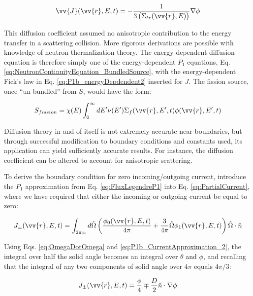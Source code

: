 \documentclass[10pt]{article}
\newcommand{\hO}{\hat{\Omega}}
\newcommand{\spas}{(\vv{r},E,t)}
\begin{document}
\begin{flushleft}
\begin{equation}
\label{eq:P1b_energyDepdendent2}
\vv{J}\spas = -\frac{1}{3\left(\Sigma_{tr}(\vv{r},E)\right)}\nabla\phi
\end{equation}

This diffusion coefficient assumed no anisotropic contribution to the energy transfer in a scattering collision. More rigorous derivations are possible with knowledge of neutron thermalization theory. The energy-dependent diffusion equation is therefore simply one of the energy-dependent \(P_1\) equations, Eq. \ref{eq:NeutronContinuityEquation_BundledSource}, with the energy-dependent Fick's law in Eq. \ref{eq:P1b_energyDepdendent2} inserted for \(J\). The fission source, once ``un-bundled'' from \(S\), would have the form:

\begin{equation}
\label{eq:FissionSource}
S_{fission}=\chi(E)\int_{0}^{\infty}dE'\nu(E')\Sigma_f(\vv{r}, E', t)\phi(\vv{r}, E', t)
\end{equation}

Diffusion theory in and of itself is not extremely accurate near boundaries, but through successful modification to boundary conditions and constants used, its application can yield sufficiently accurate results. For instance, the diffusion coefficient can be altered to account for anisotropic scattering. 

To derive the boundary condition for zero incoming/outgoing current, introduce the \(P_1\) approximation from Eq. \ref{eq:FluxLegendreP1} into Eq. \ref{eq:PartialCurrent}, where we have required that either the incoming or outgoing current be equal to zero:

\begin{equation}
\label{eq:PartialCurrent_BC1}
J_\pm \spas = \int_{2\pi\pm}^{} d\hO   \left(\frac{\phi_0\spas}{4\pi} + \frac{3}{4\pi} \hO  \phi_1\spas\right)\hO  \cdot\hat{n}
\end{equation}

Using Eqs. \ref{eq:OmegaDotOmega} and \ref{eq:P1b_CurrentApproximation_2}, the integral over half the solid angle becomes an integral over \(\theta\) and \(\phi\), and recalling that the integral of any two components of solid angle over \(4\pi\) equals \(4\pi/3\):

\begin{equation}
\label{eq:PartialCurrent_BC2}
J_\pm \spas = \frac{\phi}{4} \mp \frac{D}{2}\hat{n}\cdot\nabla\phi
\end{equation}


\end{flushleft}
\end{document}
